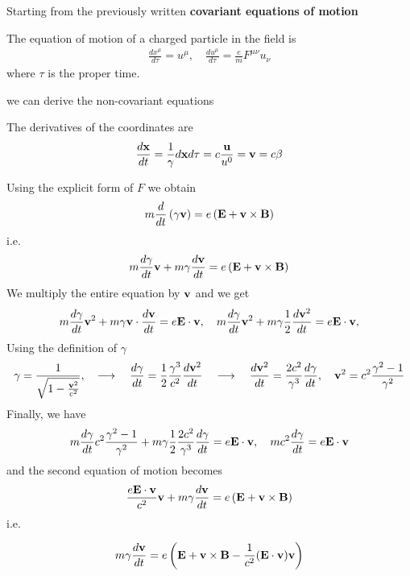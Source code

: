 Starting from the previously written {\bf covariant equations of motion}

The equation of motion of a charged particle in the field is
\begin{align}
  \frac{dx^{\mu}}{d\tau}=u^{\mu},\quad \frac{du^{\mu}}{d\tau}=\frac{e}{m}F^{\mu\nu}u_{\nu}
\end{align}
where $\tau$ is the proper time.

we can derive the  non-covariant equations

The derivatives of the coordinates are
\begin{align}
  \frac{d{\bf x}}{dt} =\frac1{\gamma}d{\bf x}{d\tau}=c\frac{\bf u}{u^0}={\bf v} =c{\bf\beta}
\end{align}

Using the explicit form of $F$ we obtain
\begin{align}
  m\frac{d}{dt}\left(\gamma{\bf v}\right)=e\left({\bf E}+{\bf v}\times{\bf B}\right)
\end{align}
i.e.
\begin{align}
  m\frac{d\gamma}{dt}{\bf v}+m\gamma\frac{d{\bf v}}{dt}=e\left({\bf E}+{\bf v}\times{\bf B}\right)
\end{align}
We multiply the entire equation by ${\bf v}$ and we get
\begin{align}
  m\frac{d\gamma}{dt}{\bf v}^2+m\gamma{\bf v}\cdot\frac{d{\bf v}}{dt}=e{\bf E}\cdot{\bf v}, \quad  m\frac{d\gamma}{dt}{\bf v}^2+m\gamma\frac12\frac{d{\bf v}^2}{dt}=e{\bf E}\cdot{\bf v},
\end{align}
Using the definition of $\gamma$
\begin{align}
  \gamma=\frac1{\sqrt{1-\frac{{\bf v}^2}{c^2}}},\quad \longrightarrow \quad \frac{d\gamma}{dt}=\frac12\frac{\gamma^3}{c^2}\frac{d{\bf v}^2}{dt}\quad \longrightarrow \quad \frac{d{\bf v}^2}{dt}=\frac{2c^2}{\gamma^3}\frac{d\gamma}{dt},\quad {\bf v}^2=c^2\frac{\gamma^2-1}{\gamma^2}
\end{align}
Finally, we have
\begin{align}
  m\frac{d\gamma}{dt}{c^2}\frac{\gamma^2-1}{\gamma^2}+m\gamma\frac12\frac{2c^2}{\gamma^3}\frac{d\gamma}{dt}=e{\bf E}\cdot{\bf v},\quad  mc^2\frac{d\gamma}{dt} = e{\bf E}\cdot{\bf v}
\end{align}
and the second equation of motion becomes
\begin{align}
  \frac{e{\bf E}\cdot{\bf v}}{c^2}{\bf v}+m\gamma\frac{d{\bf v}}{dt}=e\left({\bf E}+{\bf v}\times{\bf B}\right)
\end{align}
i.e.
\begin{importantbox}
  \begin{align}
    m\gamma\frac{d{\bf v}}{dt}=e\left({\bf E}+{\bf v}\times{\bf B}-\frac1{c^2}({\bf E}\cdot{\bf v}){\bf v}\right)
  \end{align}
\end{importantbox}


